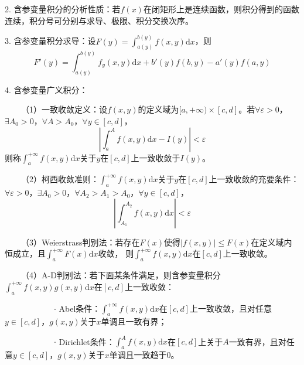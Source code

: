 2. 含参变量积分的分析性质：若$f(x)$在闭矩形上是连续函数，则积分得到的函数连续，积分号可分别与求导、极限、积分交换次序。

3. 含参变量积分求导：设$F(y)=\int_{a(y)}^{b(y)}f(x,y)\mathrm{d}x$，则
\begin{equation*}
    F'(y)=\int_{a(y)}^{b(y)}f_y(x,y)\mathrm{d}x+b'(y)f(b,y)-a'(y)f(a,y)
\end{equation*}

4. 含参变量广义积分：

~~~~（1）一致收敛定义：设$f(x,y)$的定义域为$[a,+\infty)\times[c,d]$。若$\forall \varepsilon>0$，$\exists A_0>0$，$\forall A>A_0$，$\forall y\in [c,d]$， 
\begin{equation*}
    \left|\int_a^A f(x,y)\mathrm{d} x-I(y)\right|<\varepsilon
\end{equation*}
则称$\int_a^{+\infty} f(x,y)\mathrm{d}x$关于$y$在$[c,d]$上一致收敛于$I(y)$。

~~~~（2）柯西收敛准则：$\int_a^{+\infty} f(x,y)\mathrm{d}x$关于$y$在$[c,d]$上一致收敛的充要条件：$\forall \varepsilon>0$，$\exists A_0>0$，$\forall A_2>A_1>A_0$，$\forall y\in[c,d]$，
\begin{equation*}
    \left|\int_{A_1}^{A_2}f(x,y)\mathrm{d}x\right|<\varepsilon
\end{equation*}

~~~~（3）Weierstrass判别法：若存在$F(x)$使得$|f(x,y)|\leqslant F(x)$在定义域内恒成立，且$\int_a^{+\infty}F(x)\mathrm{d}x$收敛，
则$\int_a^{+\infty} f(x,y)\mathrm{d}x$在$[c,d]$上一致收敛。

~~~~（4）A-D判别法：若下面某条件满足，则含参变量积分$\int_a^{+\infty}f(x,y)g(x,y)\mathrm{d}x$在$[c,d]$上一致收敛：

~~~~~~~~~~~~$\cdot$ Abel条件：$\int_a^{+\infty}f(x,y)\mathrm{d}x$在$[c,d]$上一致收敛，且对任意$y\in [c,d]$，$g(x,y)$关于$x$单调且一致有界；

~~~~~~~~~~~~$\cdot$ Dirichlet条件：$\int_a^{A}f(x,y)\mathrm{d}x$在$[c,d]$上关于$A$一致有界，且对任意$y \in [c,d]$，$g(x,y)$关于$x$单调且一致趋于$0$。
